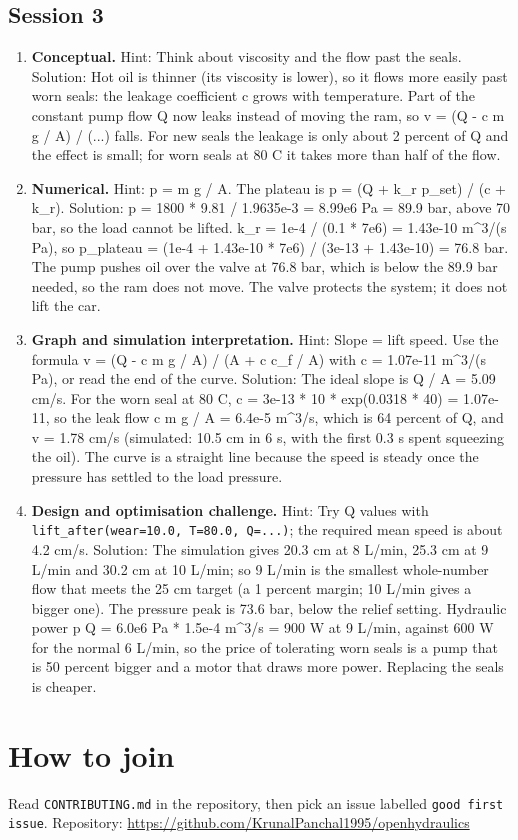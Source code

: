 \documentclass[11pt,a4paper]{article}
\begin{document}
\subsection*{Session 3}
\begin{enumerate}[nosep]
\item \textbf{Conceptual.} Hint: Think about viscosity and the flow past the seals. Solution: Hot oil is thinner (its viscosity is lower), so it flows more easily past worn seals: the leakage coefficient c grows with temperature. Part of the constant pump flow Q now leaks instead of moving the ram, so v = (Q - c m g / A) / (...) falls. For new seals the leakage is only about 2 percent of Q and the effect is small; for worn seals at 80 C it takes more than half of the flow.
\item \textbf{Numerical.} Hint: p = m g / A. The plateau is p = (Q + k\_r p\_set) / (c + k\_r). Solution: p = 1800 * 9.81 / 1.9635e-3 = 8.99e6 Pa = 89.9 bar, above 70 bar, so the load cannot be lifted. k\_r = 1e-4 / (0.1 * 7e6) = 1.43e-10 m\textasciicircum{}3/(s Pa), so p\_plateau = (1e-4 + 1.43e-10 * 7e6) / (3e-13 + 1.43e-10) = 76.8 bar. The pump pushes oil over the valve at 76.8 bar, which is below the 89.9 bar needed, so the ram does not move. The valve protects the system; it does not lift the car.
\item \textbf{Graph and simulation interpretation.} Hint: Slope = lift speed. Use the formula v = (Q - c m g / A) / (A + c c\_f / A) with c = 1.07e-11 m\textasciicircum{}3/(s Pa), or read the end of the curve. Solution: The ideal slope is Q / A = 5.09 cm/s. For the worn seal at 80 C, c = 3e-13 * 10 * exp(0.0318 * 40) = 1.07e-11, so the leak flow c m g / A = 6.4e-5 m\textasciicircum{}3/s, which is 64 percent of Q, and v = 1.78 cm/s (simulated: 10.5 cm in 6 s, with the first 0.3 s spent squeezing the oil). The curve is a straight line because the speed is steady once the pressure has settled to the load pressure.
\item \textbf{Design and optimisation challenge.} Hint: Try Q values with \texttt{lift\_after(wear=10.0, T=80.0, Q=...)}; the required mean speed is about 4.2 cm/s. Solution: The simulation gives 20.3 cm at 8 L/min, 25.3 cm at 9 L/min and 30.2 cm at 10 L/min; so 9 L/min is the smallest whole-number flow that meets the 25 cm target (a 1 percent margin; 10 L/min gives a bigger one). The pressure peak is 73.6 bar, below the relief setting. Hydraulic power p Q = 6.0e6 Pa * 1.5e-4 m\textasciicircum{}3/s = 900 W at 9 L/min, against 600 W for the normal 6 L/min, so the price of tolerating worn seals is a pump that is 50 percent bigger and a motor that draws more power. Replacing the seals is cheaper.
\end{enumerate}

\section{How to join}
Read \texttt{CONTRIBUTING.md} in the repository, then pick an issue labelled \texttt{good first issue}. Repository: \url{https://github.com/KrunalPanchal1995/openhydraulics}
\end{document}

